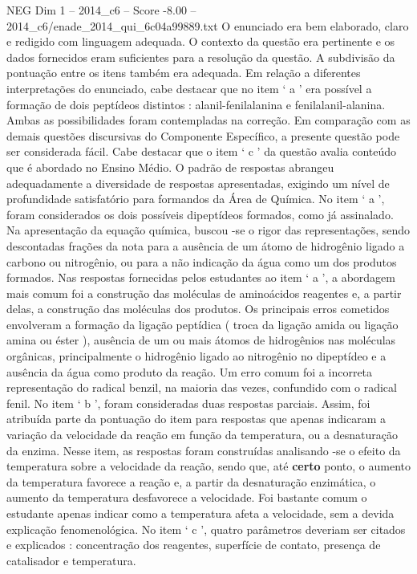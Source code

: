 \begin{textsample}{NEG Dim 1 – 2014\_c6 – Score -8.00 – 2014\_c6/enade\_2014\_qui\_6c04a99889.txt}
O enunciado era bem elaborado, claro e redigido com linguagem adequada.
O contexto da questão era pertinente e os dados fornecidos eram suficientes para a resolução da questão.
A subdivisão da pontuação entre os itens também era adequada.
Em relação a diferentes interpretações do enunciado, cabe destacar que no item ‘ a ’ era possível a formação de dois peptídeos distintos : alanil-fenilalanina e fenilalanil-alanina.
Ambas as possibilidades foram contempladas na correção.
Em comparação com as demais questões discursivas do Componente Específico, a presente questão pode ser considerada fácil.
Cabe destacar que o item ‘ c ’ da questão avalia conteúdo que é abordado no Ensino Médio.
O padrão de respostas abrangeu adequadamente a diversidade de respostas apresentadas, exigindo um nível de profundidade satisfatório para formandos da Área de Química.
No item ‘ a ’, foram considerados os dois possíveis dipeptídeos formados, como já assinalado.
Na apresentação da equação química, buscou -se o rigor das representações, sendo descontadas frações da nota para a ausência de um átomo de hidrogênio ligado a carbono ou nitrogênio, ou para a não indicação da água como um dos produtos formados.
Nas respostas fornecidas pelos estudantes ao item ‘ a ’, a abordagem mais comum foi a construção das moléculas de aminoácidos reagentes e, a partir delas, a construção das moléculas dos produtos.
Os principais erros cometidos envolveram a formação da ligação peptídica ( troca da ligação amida ou ligação amina ou éster ), ausência de um ou mais átomos de hidrogênios nas moléculas orgânicas, principalmente o hidrogênio ligado ao nitrogênio no dipeptídeo e a ausência da água como produto da reação.
Um erro comum foi a incorreta representação do radical benzil, na maioria das vezes, confundido com o radical fenil.
No item ‘ b ’, foram consideradas duas respostas parciais.
Assim, foi atribuída parte da pontuação do item para respostas que apenas indicaram a variação da velocidade da reação em função da temperatura, ou a desnaturação da enzima.
Nesse item, as respostas foram construídas analisando -se o efeito da temperatura sobre a velocidade da reação, sendo que, até \textbf{certo} ponto, o aumento da temperatura favorece a reação e, a partir da desnaturação enzimática, o aumento da temperatura desfavorece a velocidade.
Foi bastante comum o estudante apenas indicar como a temperatura afeta a velocidade, sem a devida explicação fenomenológica.
No item ‘ c ’, quatro parâmetros deveriam ser citados e explicados : concentração dos reagentes, superfície de contato, presença de catalisador e temperatura.

\end{textsample}
